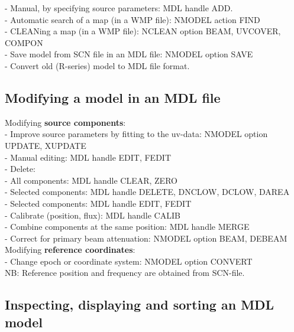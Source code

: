 - Manual, by specifying source parameters: MDL handle ADD.\\ 
- Automatic search of a map (in a WMP file): NMODEL action FIND\\ 
- CLEANing a map (in a WMP file): NCLEAN option BEAM, UVCOVER, COMPON\\ 
- Save model from SCN file in an MDL file: NMODEL option SAVE\\ 
- Convert old (R-series) model to \NEWSTAR MDL file format.\\ 

\subsection{Modifying a model in an MDL file} 
\label{mdl.modify} 

Modifying {\bf source components}:\\ 
- Improve source parameters by fitting to the uv-data: 
		NMODEL option UPDATE, XUPDATE\\ 
- Manual editing: MDL handle EDIT, FEDIT\\ 
- Delete:\\ 
\hspace*{5mm} - All components: MDL handle CLEAR, ZERO\\ 
\hspace*{5mm} - Selected components: 
		MDL handle DELETE, DNCLOW, DCLOW, DAREA\\ 
\hspace*{5mm} - Selected components: MDL handle EDIT, FEDIT\\ 
- Calibrate (position, flux): MDL handle CALIB\\ 
- Combine components at the same position: MDL handle MERGE\\ 
- Correct for primary beam attenuation: NMODEL option BEAM, DEBEAM\\ 

Modifying {\bf reference coordinates}:\\ 
- Change epoch or coordinate system: NMODEL option CONVERT\\ 
NB: Reference position and frequency are obtained from SCN-file.\\ 

\subsection{Inspecting, displaying and sorting an MDL model} 
\label{mdl.inspect} 

